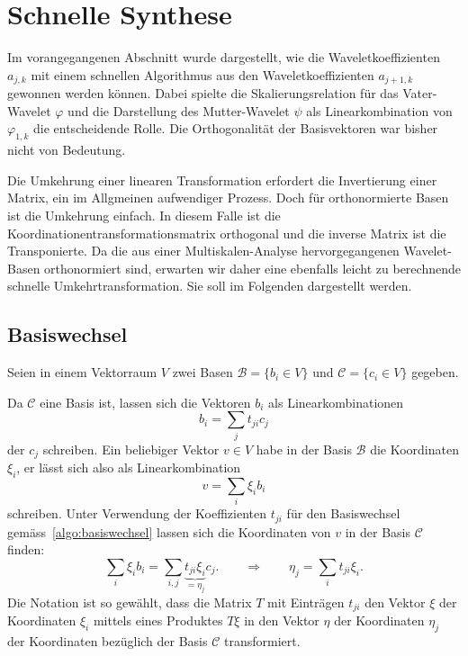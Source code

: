 %
%
%
\section{Schnelle Synthese\label{section:schnelle-synthese}}
Im vorangegangenen Abschnitt wurde dargestellt, wie die Waveletkoeffizienten
$a_{j,k}$ mit einem schnellen Algorithmus aus den Waveletkoeffizienten
$a_{j+1,k}$ gewonnen werden können.
Dabei spielte die Skalierungsrelation für das Vater-Wavelet $\varphi$ und die
Darstellung des Mutter-Wavelet $\psi$ als Linearkombination von $\varphi_{1,k}$
die entscheidende Rolle.
Die Orthogonalität der Basisvektoren war bisher nicht von Bedeutung.

Die Umkehrung einer linearen Transformation erfordert die
Invertierung einer Matrix, ein im Allgmeinen aufwendiger Prozess.
Doch für orthonormierte Basen ist die Umkehrung einfach.
In diesem Falle ist die Koordinationentransformationsmatrix
orthogonal und die inverse Matrix ist die Transponierte.
Da die aus einer Multiskalen-Analyse hervorgegangenen Wavelet-Basen
orthonormiert sind, erwarten wir daher eine ebenfalls leicht zu
berechnende schnelle Umkehrtransformation.
Sie soll im Folgenden dargestellt werden.

%
%
\subsection{Basiswechsel}
Seien in einem Vektorraum $V$ zwei Basen
$\mathcal{B}=\{b_i\in V\}$ und $\mathcal{C}=\{c_i\in V\}$ gegeben.

Da $\mathcal{C}$ eine Basis ist, lassen sich die Vektoren $b_i$ als
Linearkombinationen
\begin{equation}
b_i = \sum_{j}  t_{ji}c_j
\label{algo:basiswechsel}
\end{equation}
der $c_j$ schreiben.
Ein beliebiger Vektor $v\in V$ habe in der Basis $\mathcal{B}$ die
Koordinaten $\xi_i$, er lässt sich also als Linearkombination
\[
v=\sum_{i} \xi_i b_i
\]
schreiben.
Unter Verwendung der Koeffizienten $t_{ji}$ für den Basiswechsel
gemäss~\eqref{algo:basiswechsel} lassen
sich die Koordinaten von $v$ in der Basis $\mathcal{C}$ finden:
\[
\sum_{i} \xi_i b_i
=
\sum_{i,j} \underbrace{t_{ji}\xi_i}_{\displaystyle=\eta_j} c_j.
\qquad\Rightarrow\qquad
\eta_j = \sum_{i} t_{ji} \xi _i.
\]
Die Notation ist so gewählt, dass die Matrix $T$ mit Einträgen $t_{ji}$ 
den Vektor $\xi$ der Koordinaten $\xi_i$ mittels eines Produktes $T\xi$
in den Vektor $\eta$ der Koordinaten $\eta_j$ der Koordinaten bezüglich
der Basis $\mathcal{C}$ transformiert.

